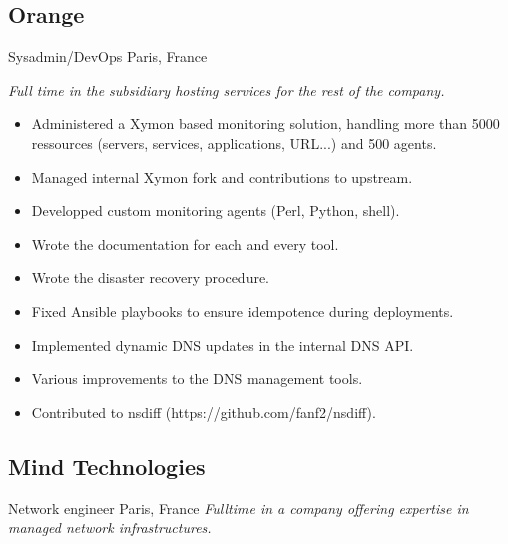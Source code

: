 \documentclass[]{friggeri-cv} %
\begin{document}
\subsection{Orange}
\begin{entrylist}
 {Sysadmin/DevOps} {Paris, France} {
  \emph{Full time in the subsidiary hosting services for the rest of the company.}
  \begin{itemize}
    \item Administered a Xymon based monitoring solution, handling more than 5000 ressources (servers, services, applications, URL...) and 500 agents.
    \item Managed internal Xymon fork and contributions to upstream.
    \item Developped custom monitoring agents (Perl, Python, shell).
    \item Wrote the documentation for each and every tool.
    \item Wrote the disaster recovery procedure.
    \item Fixed Ansible playbooks to ensure idempotence during deployments.
    \item Implemented dynamic DNS updates in the internal DNS API.
    \item Various improvements to the DNS management tools.
    \item Contributed to nsdiff (https://github.com/fanf2/nsdiff).
  \end{itemize}
}
\end{entrylist}


\subsection{Mind Technologies}
\begin{entrylist}
 {Network engineer} {Paris, France} {
  \emph{Fulltime in a company offering expertise in managed network infrastructures.}
}
\end{entrylist}


\pagebreak
\end{document}
